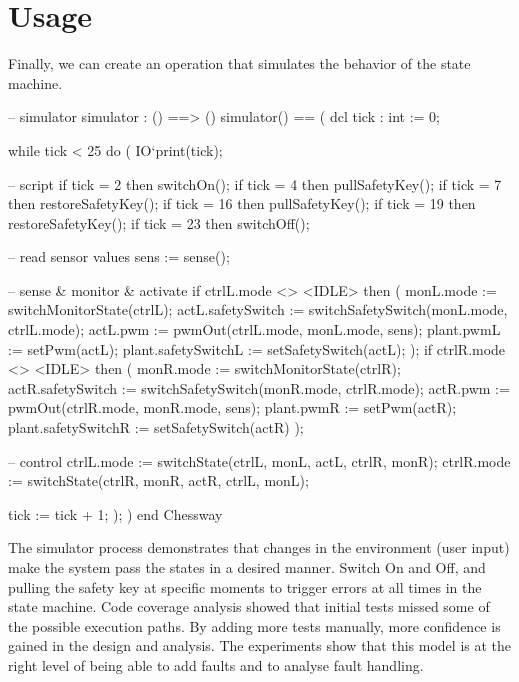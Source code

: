 \section{Usage}
Finally,
we can create an operation that simulates the behavior of the state
machine.
\begin{vdm_al}
  -- simulator
  simulator : () ==> ()
  simulator() == (
    dcl tick : int := 0;

    while tick < 25 do (
      IO`print(tick);

      -- script
      if tick = 2
        then switchOn();
      if tick = 4
        then pullSafetyKey();
      if tick = 7
        then restoreSafetyKey();
      if tick = 16
        then pullSafetyKey();
      if tick = 19
        then restoreSafetyKey();
      if tick = 23
        then switchOff();

      -- read sensor values
      sens := sense();

      -- sense & monitor & activate
      if ctrlL.mode <> <IDLE>
        then (
          monL.mode := switchMonitorState(ctrlL);
          actL.safetySwitch :=
            switchSafetySwitch(monL.mode, ctrlL.mode);
          actL.pwm := pwmOut(ctrlL.mode, monL.mode, sens);
          plant.pwmL := setPwm(actL);
          plant.safetySwitchL := setSafetySwitch(actL);
      );
      if ctrlR.mode <> <IDLE>
	    then (
          monR.mode := switchMonitorState(ctrlR);
          actR.safetySwitch :=
            switchSafetySwitch(monR.mode, ctrlR.mode);
          actR.pwm := pwmOut(ctrlR.mode, monR.mode, sens);
          plant.pwmR := setPwm(actR);
          plant.safetySwitchR := setSafetySwitch(actR)
        );

      -- control
      ctrlL.mode := switchState(ctrlL, monL, actL, ctrlR, monR);
      ctrlR.mode := switchState(ctrlR, monR, actR, ctrlL, monL);

      tick := tick + 1;
    );
  )
end Chessway
\end{vdm_al}

The simulator process demonstrates that changes in the environment
(user input) make the system pass the states in a desired
manner. Switch \textsf{On} and \textsf{Off}, and pulling the safety
key at specific moments to trigger errors at all times in the state
machine.  Code coverage analysis showed that initial tests missed some
of the possible execution paths. By adding more tests manually, more
confidence is gained in the design and analysis. The experiments show
that this model is at the right level of being able to add faults and
to analyse fault handling.

